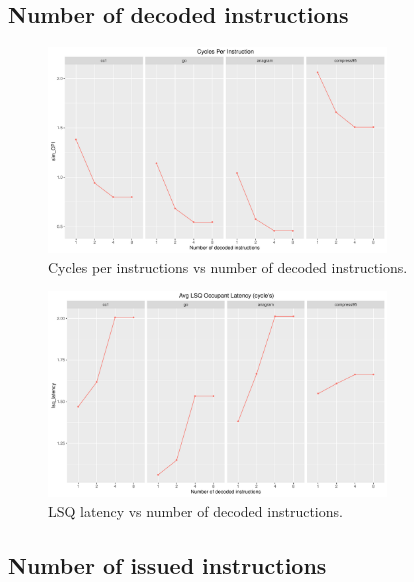 \documentclass[10pt]{scrartcl}
\begin{document}
\FloatBarrier

\subsection{Number of decoded instructions}

\begin{figure}[h]
  \centering
  \includegraphics[width=0.8\textwidth]{Plots/plot_D_sim_CPI}
  \caption{Cycles per instructions vs number of decoded instructions.}\label{fig:d_sim_cpi}
\end{figure}

\begin{figure}[h]
  \centering
  \includegraphics[width=0.8\textwidth]{Plots/plot_D_lsq_latency}
  \caption{LSQ latency vs number of decoded instructions.}\label{fig:d_lsq_latency}
\end{figure}

\FloatBarrier

\subsection{Number of issued instructions}
\end{document}
